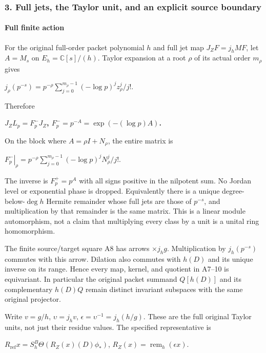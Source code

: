 \documentclass{article}
\begin{document}
\subsubsection{3. Full jets, the Taylor unit, and an explicit source boundary}\label{endpoint-f1_scaling--full-jets-the-taylor-unit-and-an-explicit-source-boundary}

\paragraph{Full finite action}\label{endpoint-f1_scaling--full-finite-action}

For the original full-order packet polynomial \(h\) and full jet map \(J_ZF=j_h MF\), let \(A=M_s\) on \(E_h=\mathbb C[s]/(h)\). Taylor expansion at a root \(\rho\) of its actual order \(m_\rho\) gives

\(j_\rho(p^{-s})=p^{-\rho} \sum_{j=0}^{m_\rho-1}(-\log p)^j z_\rho^j/j!\).

Therefore

\textbf{\(J_Z L_p=F_p^- J_Z\), \(F_p^-=p^{-A}=\exp(-(\log p)A)\).}

On the block where \(A=\rho I+N_\rho\), the entire matrix is

\(\left.F_p^-\right|_\rho=p^{-\rho}\sum_{j=0}^{m_\rho-1}(-\log p)^j N_\rho^j/j!\).

The inverse is \(F_p^+=p^A\) with all signs positive in the nilpotent sum. No Jordan level or exponential phase is dropped. Equivalently there is a unique degree-below-\(\deg h\) Hermite remainder whose full jets are those of \(p^{-s}\), and multiplication by that remainder is the same matrix. This is a linear module automorphism, not a claim that multiplying every class by a unit is a unital ring homomorphism.

The finite source/target square A8 has arrows \(\times j_hg\). Multiplication by \(j_h(p^{-s})\) commutes with this arrow. Dilation also commutes with \(h(D)\) and its unique inverse on its range. Hence every map, kernel, and quotient in A7--10 is equivariant. In particular the original packet summand \(Q[h(D)]\) and its complementary \(h(D)Q\) remain distinct invariant subspaces with the same original projector.

Write \(v=g/h\), \(\upsilon=j_hv\), \(\epsilon=\upsilon^{-1}=j_h(h/g)\). These are the full original Taylor units, not just their residue values. The specified representative is

\(R_{\mathrm{ref}} x=S_h^B \Theta(R_Z(x)(D)\phi_*)\), \(R_Z(x)=\operatorname{rem}_h(\epsilon x)\).
\end{document}
